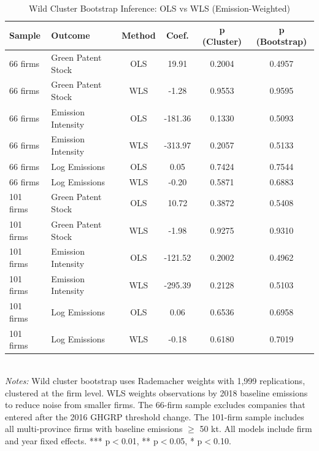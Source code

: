 
\begin{table}[ht]
\centering
\caption{Wild Cluster Bootstrap Inference: OLS vs WLS (Emission-Weighted)}
\label{tab:wild_bootstrap}
\footnotesize
\begin{tabular}{llcccc}
\toprule
\textbf{Sample} & \textbf{Outcome} & \textbf{Method} & \textbf{Coef.} & \textbf{p (Cluster)} & \textbf{p (Bootstrap)} \\
\midrule
66 firms & Green Patent Stock & OLS & 19.91 & 0.2004 & 0.4957 \\
66 firms & Green Patent Stock & WLS & -1.28 & 0.9553 & 0.9595 \\
66 firms & Emission Intensity & OLS & -181.36 & 0.1330 & 0.5093 \\
66 firms & Emission Intensity & WLS & -313.97 & 0.2057 & 0.5133 \\
66 firms & Log Emissions & OLS & 0.05 & 0.7424 & 0.7544 \\
66 firms & Log Emissions & WLS & -0.20 & 0.5871 & 0.6883 \\
\midrule
101 firms & Green Patent Stock & OLS & 10.72 & 0.3872 & 0.5408 \\
101 firms & Green Patent Stock & WLS & -1.98 & 0.9275 & 0.9310 \\
101 firms & Emission Intensity & OLS & -121.52 & 0.2002 & 0.4962 \\
101 firms & Emission Intensity & WLS & -295.39 & 0.2128 & 0.5103 \\
101 firms & Log Emissions & OLS & 0.06 & 0.6536 & 0.6958 \\
101 firms & Log Emissions & WLS & -0.18 & 0.6180 & 0.7019 \bottomrule
\end{tabular}
\vspace{0.3em}
\\
\footnotesize
\textit{Notes:} Wild cluster bootstrap uses Rademacher weights with 1,999 replications, clustered at the firm level. WLS weights observations by 2018 baseline emissions to reduce noise from smaller firms. The 66-firm sample excludes companies that entered after the 2016 GHGRP threshold change. The 101-firm sample includes all multi-province firms with baseline emissions $\geq$ 50 kt. All models include firm and year fixed effects. *** p$<$0.01, ** p$<$0.05, * p$<$0.10.
\end{table}
